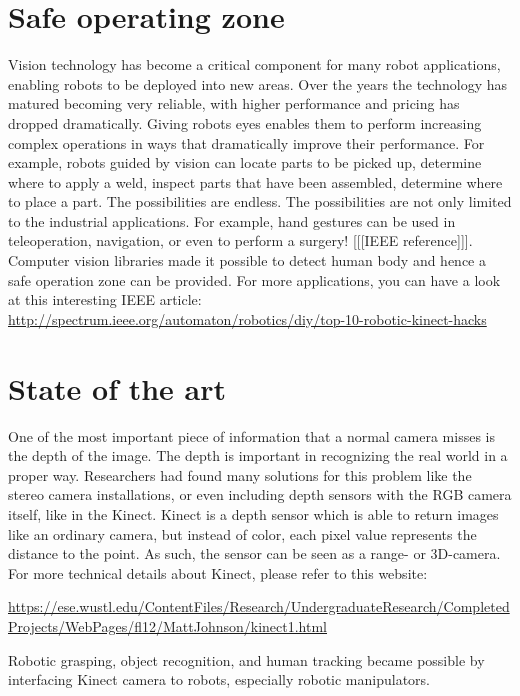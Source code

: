 
\section{Safe operating zone}
Vision technology has become a critical component for many robot applications, enabling robots to be deployed into new areas.  Over the years the technology has matured becoming very reliable, with higher performance and pricing has dropped dramatically.
Giving robots eyes enables them to perform increasing complex operations in ways that dramatically improve their performance. For example, robots guided by vision can locate parts to be picked up, determine where to apply a weld, inspect parts that have been assembled, determine where to place a part. The possibilities are endless.
The possibilities are not only limited to the industrial applications. For example, hand gestures can be used in teleoperation, navigation, or even to perform a surgery! [[[IEEE reference]]]. Computer vision libraries made it possible to detect human body and hence a safe operation zone can be provided. For more applications, you can have a look at this interesting IEEE article:
\url{http://spectrum.ieee.org/automaton/robotics/diy/top-10-robotic-kinect-hacks}

\section{State of the art}
One of the most important piece of information that a normal camera misses is the depth of the image. The depth is important in recognizing the real world in a proper way. Researchers had found many solutions for this problem like the stereo camera installations, or even including depth sensors with the RGB camera itself, like in the Kinect.
Kinect is a depth sensor which is able to return images like an ordinary camera, but instead of color, each pixel value represents the distance to the point. As such, the sensor can be seen as a range- or 3D-camera. For more technical details about Kinect, please refer to this website:

\url{https://ese.wustl.edu/ContentFiles/Research/UndergraduateResearch/CompletedProjects/WebPages/fl12/MattJohnson/kinect1.html}

Robotic grasping, object recognition, and human tracking became possible by interfacing Kinect camera to robots, especially robotic manipulators.

